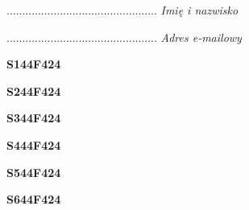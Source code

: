 \begin{turn}{90}\begin{minipage}{\linewidth} \vspace{20mm} ................................................  \textit{Imię i nazwisko}\end{minipage}\end{turn}

\begin{turn}{90}\begin{minipage}{\linewidth} \vspace{20mm} ................................................  \textit{Adres e-mailowy}\end{minipage}\end{turn}

\begin{turn}{90}\huge \begin{minipage}{\linewidth} \vspace{10mm}\textbf{S144F424}\end{minipage}\end{turn}

\begin{turn}{90}\huge \begin{minipage}{\linewidth} \vspace{10mm}\textbf{S244F424}\end{minipage}\end{turn}

\begin{turn}{90}\huge \begin{minipage}{\linewidth} \vspace{10mm}\textbf{S344F424}\end{minipage}\end{turn}

\begin{turn}{90}\huge \begin{minipage}{\linewidth} \vspace{10mm}\textbf{S444F424}\end{minipage}\end{turn}

\begin{turn}{90}\huge \begin{minipage}{\linewidth} \vspace{10mm}\textbf{S544F424}\end{minipage}\end{turn}

\begin{turn}{90}\huge \begin{minipage}{\linewidth} \vspace{10mm}\textbf{S644F424}\end{minipage}\end{turn}


